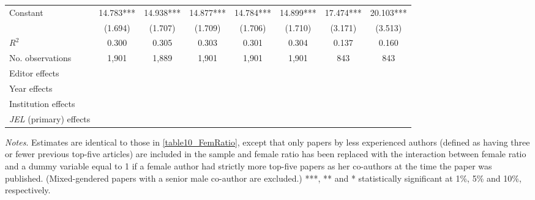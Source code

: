 \begin{table}
\begin{adjustwidth}{-0.085cm}{}
\begin{threeparttable}
\begin{tabular}{p{2.64cm}SSSSSSS}
            Constant                      &      14.783***&      14.938***&      14.877***&      14.784***&      14.899***&      17.474***&      20.103***\\
                                          &     (1.694)   &     (1.707)   &     (1.709)   &     (1.706)   &     (1.710)   &     (3.171)   &     (3.513)   \\
            \midrule
            \(R^2\)                       &       0.300   &       0.305   &       0.303   &       0.301   &       0.304   &       0.137   &       0.160   \\
            No. observations              &       1,901   &       1,889   &       1,901   &       1,901   &       1,901   &         843   &         843   \\
            \midrule
            Editor effects        &           {}   &           {}   &           {}   &           {}   &           {}   &           {}   &           {}   \\
            Year effects                  &           {}   &           {}   &           {}   &           {}   &           {}   &           {}   &           {}   \\
            Institution effects           &           {}   &           {}   &           {}   &           {}   &           {}   &           {}   &           {}   \\
            \textit{JEL} (primary) effects&               &               &               &               &               &               &           {}   \\
            \bottomrule
        \end{tabular}
        \begin{tablenotes}
            \tiny
            \item \textit{Notes}. Estimates are identical to those in \autoref{table10_FemRatio}, except that only papers by less experienced authors (defined as having three or fewer previous top-five articles) are included in the sample and female ratio has been replaced with the interaction between female ratio and a dummy variable equal to 1 if a female author had strictly more top-five papers as her co-authors at the time the paper was published. (Mixed-gendered papers with a senior male co-author are excluded.) ***, ** and * statistically significant at 1\%, 5\% and 10\%, respectively.
        \end{tablenotes}
    \end{threeparttable}
    \end{adjustwidth}
\end{table}